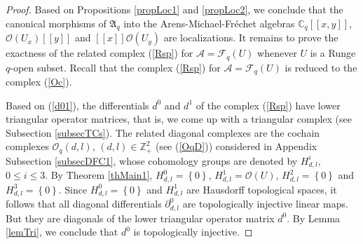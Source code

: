 \documentclass[12pt,reqno]{amsart}%
\theoremstyle{plain}
\numberwithin{theorem}{section} \numberwithin{equation}{section}
\numberwithin{lemma}{section}
\numberwithin{remark}{section}
\numberwithin{example}{section}
\numberwithin{proposition}{section}
\numberwithin{definition}{section}
\numberwithin{corollary}{section}
\begin{document}
\begin{proof}
Based on Propositions \ref{propLoc1} and \ref{propLoc2}, we conclude that the
canonical morphisms of $\mathfrak{A}_{q}$ into the Arens-Michael-Fr\'{e}chet
algebras $\mathbb{C}_{q}\left[  \left[  x,y\right]  \right]  $, $\mathcal{O}%
\left(  U_{x}\right)  \left[  \left[  y\right]  \right]  $ and $\left[
\left[  x\right]  \right]  \mathcal{O}\left(  U_{y}\right)  $ are
localizations. It remains to prove the exactness of the related complex
(\ref{Rsp}) for $\mathcal{A=F}_{q}\left(  U\right)  $ whenever $U$ is a Runge
$q$-open subset. Recall that the complex (\ref{Rsp}) for $\mathcal{A=F}%
_{q}\left(  U\right)  $ is reduced to the complex (\ref{Oc}).

Based on (\ref{d01}), the differentials $d^{0}$ and $d^{1}$ of the complex
(\ref{Rsp}) have lower triangular operator matrices, that is, we come up with
a triangular complex (see Subsection \ref{subsecTCs}). The related diagonal
complexes are the cochain complexes $\mathcal{O}_{q}\left(  d,l\right)  $,
$\left(  d,l\right)  \in\mathbb{Z}_{+}^{2}$ (see (\ref{OqD})) considered in
Appendix Subsection \ref{subsecDFC1}, whose cohomology groups are denoted by
$H_{d,l}^{i}$, $0\leq i\leq3$. By Theorem \ref{thMain1}, $H_{d,l}^{0}=\left\{
0\right\}  $, $H_{d,l}^{1}=\mathcal{O}\left(  U\right)  $, $H_{d,l}%
^{2}=\left\{  0\right\}  $ and $H_{d,l}^{3}=\left\{  0\right\}  $. Since
$H_{d,l}^{0}=\left\{  0\right\}  $ and $H_{d,l}^{1}$ are Hausdorff topological
spaces, it follows that all diagonal differentials $\partial_{d,l}^{0}$ are
topologically injective linear maps. But they are diagonals of the lower
triangular operator matrix $d^{0}$. By Lemma \ref{lemTri}, we conclude that
$d^{0}$ is topologically injective.


\end{proof}
\end{document}

